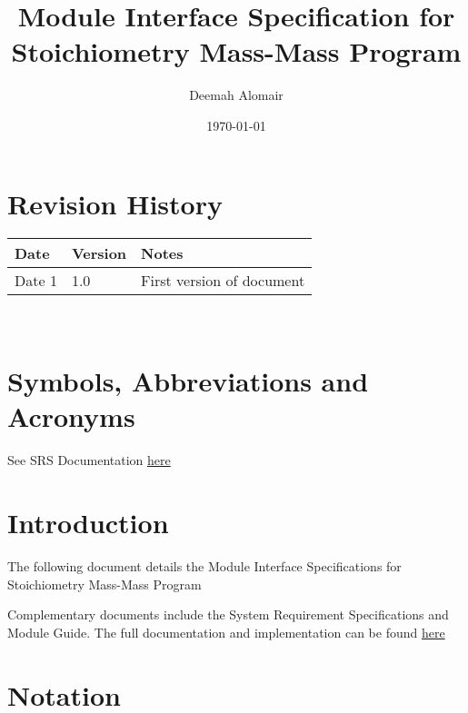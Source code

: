 \documentclass[12pt, titlepage]{article}
\begin{document}
\title{Module Interface Specification for Stoichiometry Mass-Mass Program}

\author{Deemah Alomair}

\date{\today}

\maketitle


\section{Revision History}

\begin{tabularx}{\textwidth}{p{3cm}p{2cm}X}
\toprule {\bf Date} & {\bf Version} & {\bf Notes}\\
\midrule
Date 1 & 1.0 & First version of document\\
\bottomrule
\end{tabularx}

~\newpage

\section{Symbols, Abbreviations and Acronyms}

See SRS Documentation  \href{https://github.com/deemaalomair1/CAS741_project/tree/master/docs/SRS}{here}


\newpage

\tableofcontents

\newpage


\section{Introduction}

The following document details the Module Interface Specifications for
Stoichiometry Mass-Mass Program

Complementary documents include the System Requirement Specifications
and Module Guide.  The full documentation and implementation can be
found \href{https://github.com/deemaalomair1/CAS741_project/tree/master/docs}{here}

\section{Notation}
\end{document}
